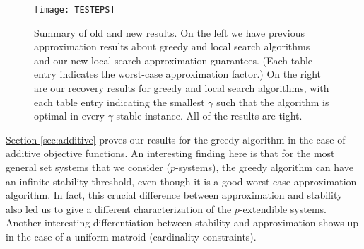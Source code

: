 \begin{figure}[h!]
	\centering
	\texttt{[image: TESTEPS]}
        \caption{Summary of old and new results. 
On the left we have
          previous approximation results about greedy and local
          search          algorithms~\cite{korte1978analysis,nemhauser1978analysis,fisher1978analysis,
            reichel2007evolutionary} and our new local search
          approximation guarantees. (Each table entry indicates the
          worst-case approximation factor.)  On the right are our recovery
          results for greedy and local search algorithms, with each
          table entry indicating the smallest $\gamma$ such that the
          algorithm is optimal in every $\gamma$-stable instance.
All of the results are tight.}
	\label{table-results}
\end{figure}

\hyperref[sec:additive]{Section \ref{sec:additive}} proves our results
for the greedy algorithm in the case of additive objective functions.
An interesting finding here is that for the most general set systems that
we consider ($p$-systems), the greedy algorithm can have an
infinite stability threshold, even though it is a good worst-case
approximation algorithm. In fact, this crucial difference between approximation and stability also led us to give a different characterization of the $p$-extendible systems. Another interesting differentiation between stability and approximation 
shows up in the case of a uniform matroid (cardinality constraints).

